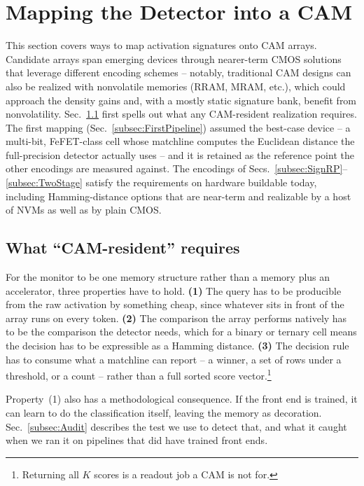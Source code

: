\documentclass[conference]{IEEEtran}
\newcommand{\cam}{{CAM}\xspace}
\newcommand{\fefet}{{FeFET}\xspace}
\begin{document}

\section{Mapping the Detector into a CAM}
\label{sec:Mapping}

This section covers ways to map activation signatures onto \cam
arrays. Candidate arrays span emerging devices through nearer-term
CMOS solutions that leverage different encoding schemes -- notably,
traditional \cam designs can also be realized with nonvolatile
memories (RRAM, MRAM, etc.), which could approach the density gains
and, with a mostly static signature bank, benefit from
nonvolatility. Sec.~\ref{subsec:Requirements} first spells out what
any \cam-resident realization requires. The first mapping
(Sec.~\ref{subsec:FirstPipeline}) assumed the best-case device -- a
multi-bit, \fefet-class cell whose matchline computes the Euclidean
distance the full-precision detector actually uses -- and it is
retained as the reference point the other encodings are measured
against. The encodings of
Secs.~\ref{subsec:SignRP}--\ref{subsec:TwoStage} satisfy the
requirements on hardware buildable today, including Hamming-distance
options that are near-term and realizable by a host of NVMs as well
as by plain CMOS.

\subsection{What ``CAM-resident'' requires}
\label{subsec:Requirements}
For the monitor to be one memory structure rather than a memory plus an
accelerator, three properties have to hold. {\bf (1)} The query has to
be producible from the raw activation by something cheap, since whatever
sits in front of the array runs on every token. {\bf (2)} The comparison
the array performs natively has to be the comparison the detector needs,
which for a binary or ternary cell means the decision has to be
expressible as a Hamming distance. {\bf (3)} The decision rule has to
consume what a matchline can report -- a winner, a set of rows under a
threshold, or a count -- rather than a full sorted score
vector.\footnote{Returning all $K$ scores is a readout job a \cam is
not for.}

Property~(1) also has a methodological consequence. If the front end is
trained, it can learn to do the classification itself, leaving the
memory as decoration. Sec.~\ref{subsec:Audit} describes the test we
use to detect that, and what it caught when we ran it on pipelines
that did have trained front ends.
\end{document}
